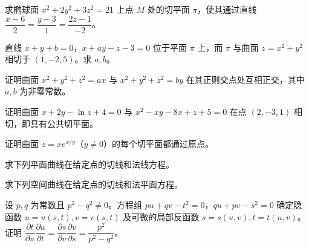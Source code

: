\noindent\begin{minipage}{\textwidth}
求椭球面 $x^2+2y^2+3z^2=21$ 上点 $M$ 处的切平面 $\pi$，使其通过直线 $\dfrac{x-6}{2}=\dfrac{y-3}{1}=\dfrac{2z-1}{-2}$。
\end{minipage}\par\vfill
\noindent\begin{minipage}{\textwidth}
直线 $x+y+b=0$，$x+ay-z-3=0$ 位于平面 $\pi$ 上，而 $\pi$ 与曲面 $z=x^2+y^2$ 相切于 $(1,-2,5)$。求 $a,b$。
\end{minipage}\par\vfill
\noindent\begin{minipage}{\textwidth}
证明曲面 $x^2+y^2+z^2=ax$ 与 $x^2+y^2+z^2=by$ 在其正则交点处互相正交，其中 $a,b$ 为非零常数。
\end{minipage}\par\vfill
\newpage
\noindent\begin{minipage}{\textwidth}
证明曲面 $x+2y-\ln z+4=0$ 与 $x^2-xy-8x+z+5=0$ 在点 $(2,-3,1)$ 相切，即具有公共切平面。
\end{minipage}\par\vfill
\noindent\begin{minipage}{\textwidth}
证明曲面 $z=xe^{x/y}$（$y\ne0$）的每个切平面都通过原点。
\end{minipage}\par\vfill
\noindent\begin{minipage}{\textwidth}
求下列平面曲线在给定点的切线和法线方程。
\end{minipage}\par\vfill
\noindent\begin{minipage}{\textwidth}
求下列空间曲线在给定点的切线和法平面方程。
\end{minipage}\par\vfill
\newpage
\noindent\begin{minipage}{\textwidth}
设 $p,q$ 为常数且 $p^2-q^2\ne0$。方程组 $pu+qv-t^2=0$，$qu+pv-s^2=0$ 确定隐函数 $u=u(s,t),v=v(s,t)$ 及可微的局部反函数 $s=s(u,v),t=t(u,v)$。证明 $\dfrac{\partial t}{\partial u}\dfrac{\partial u}{\partial t}=\dfrac{\partial s}{\partial v}\dfrac{\partial v}{\partial s}=\dfrac{p^2}{p^2-q^2}$。
\end{minipage}\par\vfill
